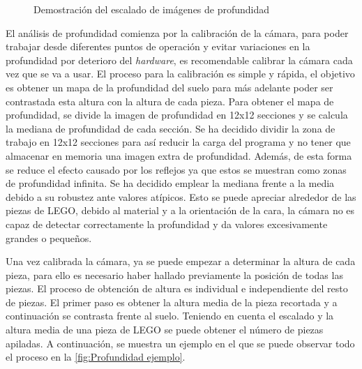 \begin{figure}[ht]  %
  \hfill	
  \hfill	
\caption{Demostración del escalado de imágenes de profundidad}
\label{fig:Profundidad escaldo}
\vspace{-5pt}
\end{figure}
	
El análisis de profundidad comienza por la calibración de la cámara, para poder trabajar desde diferentes puntos de operación y evitar variaciones en la profundidad por deterioro del \textit{hardware}, es recomendable calibrar la cámara cada vez que se va a usar. El proceso para la calibración es simple y rápida, el objetivo es obtener un mapa de la profundidad del suelo para más adelante poder ser contrastada esta altura con la altura de cada pieza. Para obtener el mapa de profundidad, se divide la imagen de profundidad en 12x12 secciones y se calcula la mediana de profundidad de cada sección. Se ha decidido dividir la zona de trabajo en 12x12 secciones para así reducir la carga del programa y no tener que almacenar en memoria una imagen extra de profundidad. Además, de esta forma se reduce el efecto causado por los reflejos ya que estos se muestran como zonas de profundidad infinita. Se ha decidido emplear la mediana frente a la media debido a su robustez ante valores atípicos. Esto se puede apreciar alrededor de las piezas de LEGO, debido al material y a la orientación de la cara, la cámara no es capaz de detectar correctamente la profundidad y da valores excesivamente grandes o pequeños.
	
Una vez calibrada la cámara, ya se puede empezar a determinar la altura de cada pieza, para ello es necesario haber hallado previamente la posición de todas las piezas. El proceso de obtención de altura es individual e independiente del resto de piezas. El primer paso es obtener la altura media de la pieza recortada y a continuación se contrasta frente al suelo. Teniendo en cuenta el escalado y la altura media de una pieza de LEGO se puede obtener el número de piezas apiladas. A continuación, se muestra un ejemplo en el que se puede observar todo el proceso en la \autoref{fig:Profundidad ejemplo}.

